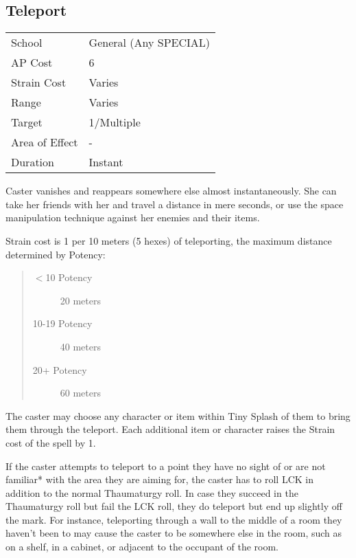 \documentclass[11pt,a4paper,twocolumn]{book}
\begin{document}

\subsection*{Teleport}
{
	\begin{tabu} to 75mm{| X[l,4] | X[l,7] |}
		\hline
		School 			& General (Any SPECIAL) 		\\
		AP Cost	      	& 6 						    \\
		Strain Cost     & Varies 						\\
		Range     		& Varies					    \\
		Target      	& 1/Multiple					\\
		Area of Effect  & - 	 						\\
		Duration     	& Instant						\\ \hline
	\end{tabu}
	
}

\medskip

Caster vanishes and reappears somewhere else almost instantaneously. She can take her friends with her and travel a distance in mere seconds, or use the space manipulation technique against her enemies and their items.

Strain cost is 1 per 10 meters (5 hexes) of teleporting, the maximum distance determined by Potency:
\begin{quote}
	\begin{description}
		\item[$<$10 Potency] 	20 meters
		\item[10-19 Potency] 	40 meters
		\item[20+ Potency] 		60 meters
	\end{description}
\end{quote}

The caster may choose any character or item within Tiny Splash of them to bring them through the teleport. Each additional item or character raises the Strain cost of the spell by 1.

If the caster attempts to teleport to a point they have no sight of or are not familiar* with the area they are aiming for, the caster has to roll LCK in addition to the normal Thaumaturgy roll. In case they succeed in the Thaumaturgy roll but fail the LCK roll, they do teleport but end up slightly off the mark. For instance, teleporting through a wall to the middle of a room they haven't been to may cause the caster to be somewhere else in the room, such as on a shelf, in a cabinet, or adjacent to the occupant of the room.
\end{document}
